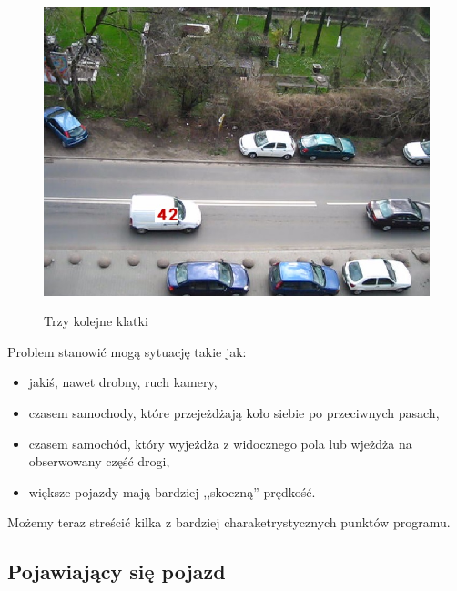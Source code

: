 \documentclass[11pt, a4paper]{article}
\begin{document}
\begin{figure}[htbp!]
{		\includegraphics[width = \W \linewidth]{pred3}%
	}%
	
	\caption{Trzy kolejne klatki}
	\label{fig:trzyKlatki}
\end{figure}

Problem stanowić mogą sytuację takie jak:
\begin{itemize}
\item jakiś, nawet drobny, ruch kamery,
\item czasem samochody, które przejeżdżają koło siebie po przeciwnych pasach,
\item czasem samochód, który wyjeżdża z widocznego pola lub wjeżdża na obserwowany część drogi,
\item większe pojazdy mają bardziej ,,skoczną'' prędkość.
\end{itemize}

Możemy teraz streścić kilka z bardziej charaketrystycznych punktów programu.

\subsection*{Pojawiający się pojazd}
\end{document}
